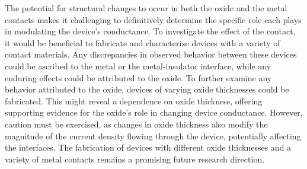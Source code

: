 
\noindent The potential for structural changes to occur in both the oxide and the metal contacts makes it challenging to definitively determine the specific role each plays in modulating the device's conductance. To investigate the effect of the contact, it would be beneficial to fabricate and characterize devices with a variety of contact materials. Any discrepancies in observed behavior between these devices could be ascribed to the metal or the metal-insulator interface, while any enduring effects could be attributed to the oxide. To further examine any behavior attributed to the oxide, devices of varying oxide thicknesses could be fabricated. This might reveal a dependence on oxide thickness, offering supporting evidence for the oxide's role in changing device conductance. However, caution must be exercised, as changes in oxide thickness also modify the magnitude of the current density flowing through the device, potentially affecting the interfaces. The fabrication of devices with different oxide thicknesses and a variety of metal contacts remains a promising future research direction.\\





